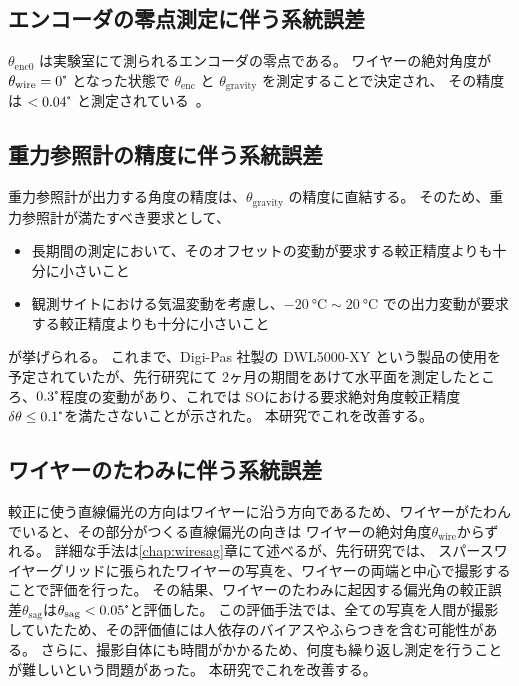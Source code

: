 \documentclass[../../main.tex]{subfiles}
\begin{document}
\subsection{エンコーダの零点測定に伴う系統誤差}
$\theta_{\mathrm{enc}0}$ は実験室にて測られるエンコーダの零点である。
ワイヤーの絶対角度が $\theta_{\mathrm{wire}} = 0\tcdegree$ となった状態で $\theta_{\mathrm{enc}}$ と $\theta_{\mathrm{gravity}}$ を測定することで決定され、
その精度は $< 0.04\tcdegree$ と測定されている~\cite{swg:iijima}。\\

\subsection{重力参照計の精度に伴う系統誤差}
重力参照計が出力する角度の精度は、$\theta_{\mathrm{gravity}}$ の精度に直結する。
そのため、重力参照計が満たすべき要求として、
\begin{itemize}
    \item 長期間の測定において、そのオフセットの変動が要求する較正精度よりも十分に小さいこと
    \item 観測サイトにおける気温変動を考慮し、$\SI{-20}{\degreeCelsius}\sim\SI{20}{\degreeCelsius}$
          での出力変動が要求する較正精度よりも十分に小さいこと
\end{itemize}
が挙げられる。
これまで、Digi-Pas 社製の DWL5000-XY という製品の使用を予定されていたが、先行研究\cite{swg:iijima}にて
2ヶ月の期間をあけて水平面を測定したところ、$0.3\tcdegree$程度の変動があり、これでは
SOにおける要求絶対角度較正精度$\delta\theta \leq 0.1\tcdegree$を満たさないことが示された。
本研究でこれを改善する。

\subsection{ワイヤーのたわみに伴う系統誤差}
\label{subsec:wg_wiresag}
較正に使う直線偏光の方向はワイヤーに沿う方向であるため、ワイヤーがたわんでいると、その部分がつくる直線偏光の向きは
ワイヤーの絶対角度$\theta_{\mathrm{wire}}$からずれる。
詳細な手法は\ref{chap:wiresag}章にて述べるが、先行研究\cite{swg:murata}\cite{swg:iijima}では、
スパースワイヤーグリッドに張られたワイヤーの写真を、ワイヤーの両端と中心で撮影することで評価を行った。
その結果、ワイヤーのたわみに起因する偏光角の較正誤差$\theta_{\mathrm{sag}}$は$\theta_{\mathrm{sag}}<0.05\tcdegree$と評価した。
この評価手法では、全ての写真を人間が撮影していたため、その評価値には人依存のバイアスやふらつきを含む可能性がある。
さらに、撮影自体にも時間がかかるため、何度も繰り返し測定を行うことが難しいという問題があった。
本研究でこれを改善する。
\end{document}
